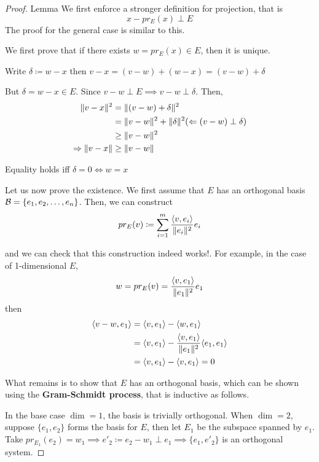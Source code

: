 \begin{proof} {Lemma}
    We first enforce a stronger definition for projection, that is \[
        x - pr_E(x) \perp E
    \]
    The proof for the general case is similar to this.

    We first prove that if there exists \(w = pr_E(x) \in E\), then it is unique.

    Write \(\delta \coloneqq w - x\) then \(v - x = (v - w) + (w - x) = (v- w) + \delta\)

    But \(\delta = w - x \in E\). Since \(v - w \perp E \implies v - w \perp \delta\). Then,
    \begin{align*}
        \lVert v-x\rVert^2        & = \lVert(v-w) + \delta\rVert ^2                                       \\
                            & = \lVert v-w\rVert^2 + \lVert\delta\rVert^2 (\Leftarrow (v-w) \perp \delta) \\
                            & \geq \lVert v-w\rVert^2                                                \\
        \Rightarrow \lVert v-x\rVert & \geq \lVert v -w\rVert
    \end{align*}

    Equality holds iff \(\delta = 0 \Leftrightarrow w = x \)

    Let us now prove the existence. We first assume that \(E\) has an orthogonal basis \(\mathcal{B} = \{e_1, e_2, \dots, e_n\}\). Then, we can construct \[
        pr_E (v) \coloneqq \sum_{i=1}^{m} \dfrac{\langle v, e_i \rangle}{\lVert e_i\rVert^2}  e_i
    \]

    and we can check that this construction indeed works!. For example, in the case of 1-dimensional \(E\), \[
        w = pr_E(v) = \dfrac{\langle v, e_1 \rangle}{\lVert e_1\rVert^2}e_1
    \]
    then
    \begin{align*}
        \langle v-w, e_1 \rangle & = \langle v, e_1 \rangle - \langle w, e_1 \rangle                                                \\
                                & = \langle v, e_1  \rangle - \dfrac{\langle v, e_1 \rangle}{\lVert e_1\rVert^2} \langle e_1, e_1 \rangle \\
                                & = \langle v, e_1  \rangle - \langle v, e_1 \rangle = 0
    \end{align*}

    What remains is to show that \(E\) has an orthogonal basis, which can be shown using the \textbf{Gram-Schmidt process}, that is inductive as follows.

    In the base case \(\dim = 1\), the basis is trivially orthogonal. When \(\dim = 2\), suppose \(\{e_1, e_2\}\) forms the basis for \(E\), then let \(E_1\) be the subspace spanned by \(e_1\). Take \(pr_{E_1}(e_2) = w_1 \implies e'_2 \coloneqq e_2 - w_1 \perp e_1 \implies \{e_1, e'_2\}\) is an orthogonal system.


\end{proof}
